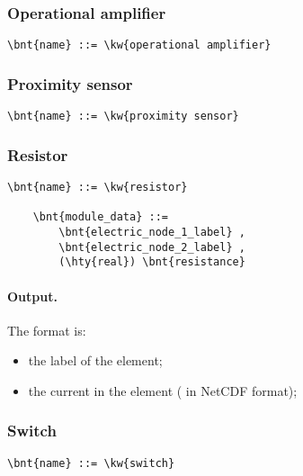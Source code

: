 \subsubsection{Operational amplifier}
\begin{Verbatim}[commandchars=\\\{\}]
    \bnt{name} ::= \kw{operational amplifier}
\end{Verbatim}


\subsubsection{Proximity sensor}
\begin{Verbatim}[commandchars=\\\{\}]
    \bnt{name} ::= \kw{proximity sensor}
\end{Verbatim}


\subsubsection{Resistor}
\label{sec:MODULE:FAB-ELECTRIC:RESISTOR}
\begin{Verbatim}[commandchars=\\\{\}]
    \bnt{name} ::= \kw{resistor}

    \bnt{module_data} ::=
        \bnt{electric_node_1_label} ,
        \bnt{electric_node_2_label} ,
        (\hty{real}) \bnt{resistance}
\end{Verbatim}

\paragraph{Output.}
\label{sec:MODULE:FAB-ELECTRIC:RESISTOR:OUTPUT}
The format is:
\begin{itemize}
\item the label of the element;
\item the current in the element ( in NetCDF format);
\end{itemize}


\subsubsection{Switch}
\begin{Verbatim}[commandchars=\\\{\}]
    \bnt{name} ::= \kw{switch}
\end{Verbatim}



